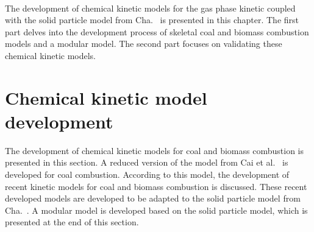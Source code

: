 \begin{refsection}
\\
The development of chemical kinetic models for the gas phase kinetic coupled with the solid particle model from Cha.~ is presented in this chapter. The first part delves into the development process of skeletal coal and biomass combustion models and a modular  model. The second part focuses on validating these chemical kinetic models.



\newpage
\section{Chemical kinetic model development}
The development of chemical kinetic models for coal and biomass combustion is presented in this section. A reduced version of the model from Cai et al.~\cite{Cai2020} is developed for coal combustion. According to this model, the development of recent kinetic models for coal and biomass combustion is discussed. These recent developed models are developed to be adapted to the solid particle model from Cha.~. A modular  model is developed based on the solid particle model, which is presented at the end of this section.



\end{refsection}
